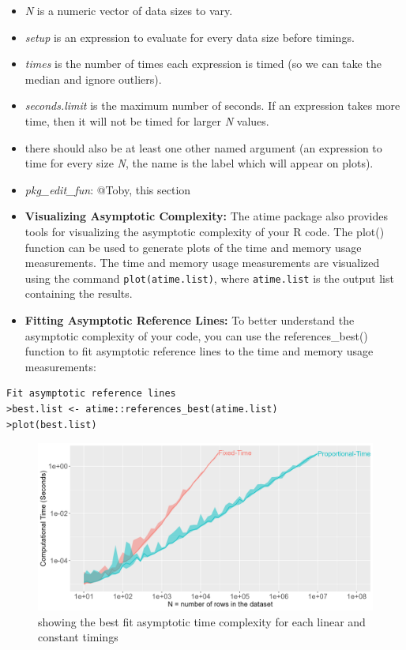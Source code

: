 \begin{itemize}
    \item \textit{N} is a numeric vector of data sizes to vary.
\item \textit{setup} is an expression to evaluate for every data size before timings.
\item \textit{times} is the number of times each expression is timed (so we can take the median and ignore outliers).
\item \textit{seconds.limit} is the maximum number of seconds. If an expression takes more time, then it will not be timed for larger \textit{N} values.
\item there should also be at least one other named argument (an expression to time for every size \textit{N}, the name is the label which will appear on plots).
\item \textit{pkg\_edit\_fun}: @Toby, this section

\end{itemize}

\begin{itemize}

    \item \textbf{Visualizing Asymptotic Complexity:} The atime package also provides tools for visualizing the asymptotic complexity of your R code. The plot() function can be used to generate plots of the time and memory usage measurements. The time and memory usage measurements are visualized using the command \texttt{plot(atime.list)}, where \texttt{atime.list} is the output list containing the results.

\vspace{0.1in}
\item \textbf{Fitting Asymptotic Reference Lines:} To better understand the asymptotic complexity of your code, you can use the references\_best() function to fit asymptotic reference lines to the time and memory usage measurements:

\end{itemize}

\begin{lstlisting}
Fit asymptotic reference lines
>best.list <- atime::references_best(atime.list)
>plot(best.list)
\end{lstlisting}
\vspace{0.1in}

\begin{figure}[H]
    \centering
    \includegraphics[width=0.8\linewidth]{figures/best.list.R.png}
    \caption{showing the best fit asymptotic time complexity for each linear and constant timings}
    \label{fig:label1}
\end{figure}

